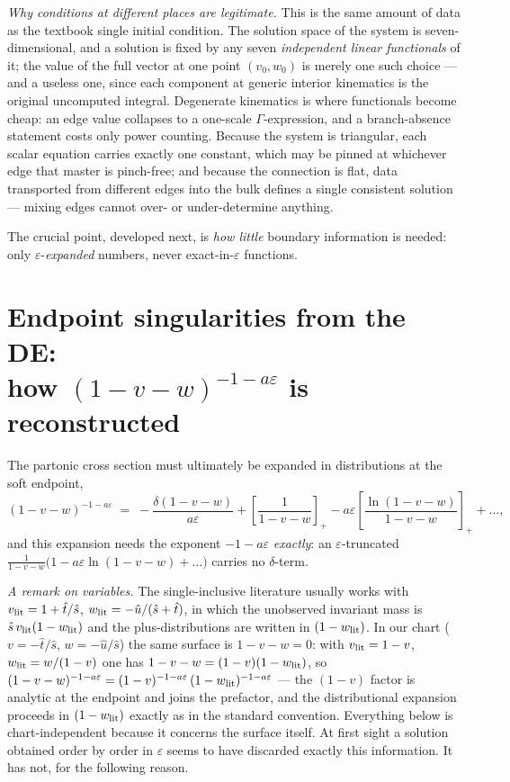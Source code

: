 \documentclass[11pt]{article}
\newcommand{\eps}{\varepsilon}
\begin{document}
\emph{Why conditions at different places are legitimate.}  This is
the same amount of data as the textbook single initial condition.
The solution space of the system is seven-dimensional, and a solution
is fixed by any seven \emph{independent linear functionals} of it;
the value of the full vector at one point $(v_0,w_0)$ is merely one
such choice --- and a useless one, since each component at generic
interior kinematics is the original uncomputed integral.  Degenerate
kinematics is where functionals become cheap: an edge value collapses
to a one-scale $\Gamma$-expression, and a branch-absence statement
costs only power counting.  Because the system is triangular, each
scalar equation carries exactly one constant, which may be pinned at
whichever edge that master is pinch-free; and because the connection
is flat, data transported from different edges into the bulk defines
a single consistent solution --- mixing edges cannot over- or
under-determine anything.

The crucial point, developed next, is \emph{how little} boundary
information is needed: only $\eps$-\emph{expanded} numbers, never
exact-in-$\eps$ functions.

\section{Endpoint singularities from the DE:\\
how $(1-v-w)^{-1-a\eps}$ is reconstructed}
\label{sec:endpoint}

The partonic cross section must ultimately be expanded in
distributions at the soft endpoint,
\begin{equation}
  (1-v-w)^{-1-a\eps}
  \;=\;
  -\frac{\delta(1-v-w)}{a\eps}
  + \left[\frac{1}{1-v-w}\right]_+
  - a\eps \left[\frac{\ln(1-v-w)}{1-v-w}\right]_+
  + \dots,
  \label{eq:plus}
\end{equation}
and this expansion needs the exponent $-1-a\eps$ \emph{exactly}: an
$\eps$-truncated $\frac{1}{1-v-w}\big(1 - a\eps\ln(1-v-w)+\dots\big)$
carries no $\delta$-term.

\emph{A remark on variables.}  The single-inclusive literature
usually works with $v_{\rm lit} = 1 + \hat t/\hat s$,
$w_{\rm lit} = -\hat u/(\hat s + \hat t)$, in which the unobserved
invariant mass is $\hat s\, v_{\rm lit}(1-w_{\rm lit})$ and the
plus-distributions are written in $(1-w_{\rm lit})$.  In our chart
($v = -\hat t/\hat s$, $w = -\hat u/\hat s$) the same surface is
$1-v-w = 0$: with $v_{\rm lit} = 1-v$, $w_{\rm lit} = w/(1-v)$ one
has $1-v-w = (1-v)(1-w_{\rm lit})$, so
$(1-v-w)^{-1-a\eps} = (1-v)^{-1-a\eps}\,(1-w_{\rm lit})^{-1-a\eps}$
--- the $(1-v)$ factor is analytic at the endpoint and joins the
prefactor, and the distributional expansion proceeds in
$(1-w_{\rm lit})$ exactly as in the standard convention.  Everything
below is chart-independent because it concerns the surface itself.  At first sight a solution obtained order
by order in $\eps$ seems to have discarded exactly this information.
It has not, for the following reason.
\end{document}
